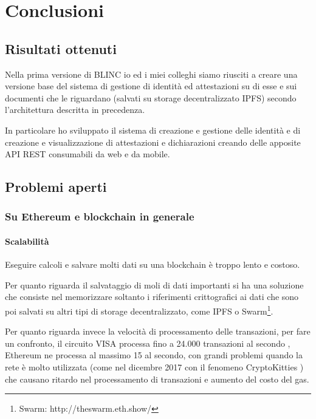 \chapter{Conclusioni}

\section{Risultati ottenuti}

Nella prima versione di BLINC io ed i miei colleghi siamo riusciti a creare una versione base del
sistema di gestione di identità ed attestazioni su di esse e sui documenti
che le riguardano (salvati su storage decentralizzato IPFS) secondo l'architettura descritta
in precedenza.

In particolare ho sviluppato il sistema di creazione e gestione delle identità e di creazione e visualizzazione
di attestazioni e dichiarazioni creando delle apposite API REST consumabili da web e da mobile.

\section{Problemi aperti}

\subsection{Su Ethereum e blockchain in generale}

\subsubsection{Scalabilità}
Eseguire calcoli e salvare molti dati su una blockchain è troppo lento e costoso. 

Per quanto riguarda il salvataggio di moli di dati
importanti si ha una soluzione che consiste nel memorizzare soltanto i riferimenti crittografici
ai dati che sono poi salvati su altri tipi
di storage decentralizzato, come IPFS o Swarm\footnote{Swarm: http://theswarm.eth.show/}.

Per quanto riguarda invece la velocità di processamento delle transazioni, per fare un confronto,
il circuito VISA processa fino a 24.000 transazioni al secondo \cite{WEBSITE:10},
Ethereum ne processa al massimo 15 al secondo, con grandi problemi quando
la rete è molto utilizzata (come nel dicembre 2017 con il fenomeno CryptoKitties \cite{WEBSITE:9})
che causano ritardo nel processamento di transazioni e aumento del costo del gas.

